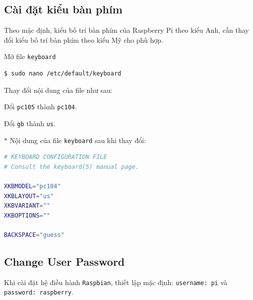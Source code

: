 \documentclass[12pt,a4paper]{article}
\begin{document}
\subsection{Cài đặt kiểu bàn phím}
	Theo mặc định, kiểu bố trí bàn phím của Raspberry Pi theo kiểu Anh, cần thay đổi kiểu bố trí bàn phím theo kiểu Mỹ cho phù hợp.
	
	\begin{list}{--}{}
		\item Mở file \verb|keyboard|
		\begin{lstlisting}[language=bash]
$ sudo nano /etc/default/keyboard
		\end{lstlisting}

		\item Thay đổi nội dung của file như sau:
			\begin{list}{+}{}
				\item Đổi \verb|pc105| thành \verb|pc104|.
				
				\item Đổi \verb|gb| thành \verb|us|.
			\end{list}
		
		\item[$\ast$] Nội dung của file \verb|keyboard| sau khi thay đổi:
			\begin{lstlisting}[language=bash]
# KEYBOARD CONFIGURATION FILE
# Consult the keyboard(5) manual page.
 
XKBMODEL="pc104"
XKBLAYOUT="us"
XKBVARIANT=""
XKBOPTIONS=""
 
BACKSPACE="guess"
			\end{lstlisting}
	\end{list}

\subsection{Change User Password}
	Khi cài đặt hệ điều hành \verb|Raspbian|, thiết lập mặc định: \verb|username: pi| và \verb|password: raspberry|.
\end{document}
